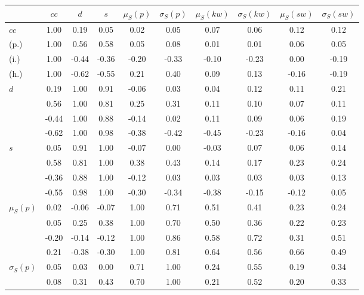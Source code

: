 \begin{table*}[h!]
\begin{center}
\begin{tabular}{| l | c | c | c | c | c | c | c | c | c |}\hline
 & $cc$ & $d$ & $s$ & $\mu_S(p)$ & $\sigma_S(p)$ & $\mu_S(kw)$ & $\sigma_S(kw)$ & $\mu_S(sw)$ & $\sigma_S(sw)$ \\\hline
$cc$ & 1.00  & 0.19  & 0.05  & 0.02  & 0.05  & 0.07  & 0.06  & 0.12  & 0.12 \\\hline
(p.) & 1.00  & 0.56  & 0.58  & 0.05  & 0.08  & 0.01  & 0.01  & 0.06  & 0.05 \\\hline
(i.) & 1.00  & -0.44  & -0.36  & -0.20  & -0.33  & -0.10  & -0.23  & 0.00  & -0.19 \\\hline
(h.) & 1.00  & -0.62  & -0.55  & 0.21  & 0.40  & 0.09  & 0.13  & -0.16  & -0.19 \\\hline
$d$ & 0.19  & 1.00  & 0.91  & -0.06  & 0.03  & 0.04  & 0.12  & 0.11  & 0.21 \\\hline
 & 0.56  & 1.00  & 0.81  & 0.25  & 0.31  & 0.11  & 0.10  & 0.07  & 0.11 \\\hline
 & -0.44  & 1.00  & 0.88  & -0.14  & 0.02  & 0.11  & 0.09  & 0.06  & 0.19 \\\hline
 & -0.62  & 1.00  & 0.98  & -0.38  & -0.42  & -0.45  & -0.23  & -0.16  & 0.04 \\\hline
$s$ & 0.05  & 0.91  & 1.00  & -0.07  & 0.00  & -0.03  & 0.07  & 0.06  & 0.14 \\\hline
 & 0.58  & 0.81  & 1.00  & 0.38  & 0.43  & 0.14  & 0.17  & 0.23  & 0.24 \\\hline
 & -0.36  & 0.88  & 1.00  & -0.12  & 0.03  & 0.03  & 0.03  & 0.03  & 0.13 \\\hline
 & -0.55  & 0.98  & 1.00  & -0.30  & -0.34  & -0.38  & -0.15  & -0.12  & 0.05 \\\hline
$\mu_S(p)$ & 0.02  & -0.06  & -0.07  & 1.00  & 0.71  & 0.51  & 0.41  & 0.23  & 0.24 \\\hline
 & 0.05  & 0.25  & 0.38  & 1.00  & 0.70  & 0.50  & 0.36  & 0.22  & 0.23 \\\hline
 & -0.20  & -0.14  & -0.12  & 1.00  & 0.86  & 0.58  & 0.72  & 0.31  & 0.51 \\\hline
 & 0.21  & -0.38  & -0.30  & 1.00  & 0.81  & 0.64  & 0.56  & 0.66  & 0.49 \\\hline
$\sigma_S(p)$ & 0.05  & 0.03  & 0.00  & 0.71  & 1.00  & 0.24  & 0.55  & 0.19  & 0.34 \\\hline
 & 0.08  & 0.31  & 0.43  & 0.70  & 1.00  & 0.21  & 0.52  & 0.20  & 0.33 \\\hline

\end{tabular}
\end{center}
\end{table*}
